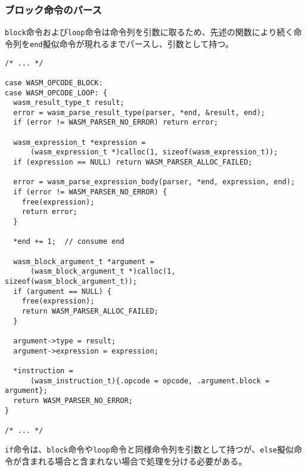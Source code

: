 \subsubsection{ブロック命令のパース}

\verb|block|命令および\verb|loop|命令は命令列を引数に取るため、先述の関数により続く命令列を\verb|end|擬似命令が現れるまでパースし、引数として持つ。

\begin{lstlisting}[caption=命令のパース,label=lst:argument_t]
/* ... */

case WASM_OPCODE_BLOCK:
case WASM_OPCODE_LOOP: {
  wasm_result_type_t result;
  error = wasm_parse_result_type(parser, *end, &result, end);
  if (error != WASM_PARSER_NO_ERROR) return error;

  wasm_expression_t *expression =
      (wasm_expression_t *)calloc(1, sizeof(wasm_expression_t));
  if (expression == NULL) return WASM_PARSER_ALLOC_FAILED;

  error = wasm_parse_expression_body(parser, *end, expression, end);
  if (error != WASM_PARSER_NO_ERROR) {
    free(expression);
    return error;
  }

  *end += 1;  // consume end

  wasm_block_argument_t *argument =
      (wasm_block_argument_t *)calloc(1, sizeof(wasm_block_argument_t));
  if (argument == NULL) {
    free(expression);
    return WASM_PARSER_ALLOC_FAILED;
  }

  argument->type = result;
  argument->expression = expression;

  *instruction =
      (wasm_instruction_t){.opcode = opcode, .argument.block = argument};
  return WASM_PARSER_NO_ERROR;
}

/* ... */
\end{lstlisting}

\verb|if|命令は、\verb|block|命令や\verb|loop|命令と同様命令列を引数として持つが、\verb|else|擬似命令が含まれる場合と含まれない場合で処理を分ける必要がある。

